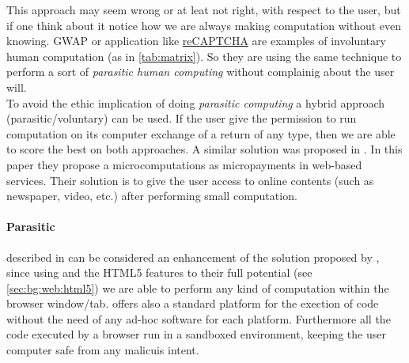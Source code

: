 This approach may seem wrong or at leat not right, with respect to the user, but
if one think about it notice how we are always making computation without even
knowing. \ac{GWAP} or application like \href{http://www.google.com/recaptcha}{reCAPTCHA}
are examples of involuntary human computation (as in \autoref{tab:matrix}). So
they are using the same technique to perform a sort of \emph{parasitic human
computing} without complainig about the user will.\\

To avoid the ethic implication of doing \emph{parasitic computing} a hybrid
approach (parasitic/voluntary) can be used. If the user give the permission to
run computation on its computer exchange of a return of any type, then we are
able to score the best on both approaches. A similar solution was proposed in
\cite{karame2011pay}.
In this paper they propose a microcomputations as micropayments in web-based
services. Their solution is to give the user access to online contents (such as
newspaper, video, etc.) after performing small \js{} computation.

\paragraph{Parasitic \js{}} described in \cite{jenkin2008parasitic} can be
considered an enhancement of the solution proposed by \cite{barabasi2001parasitic},
since using \js{} and the HTML5 features to their full potential (see
\ref{sec:bg:web:html5}) we are able to perform any kind of computation
within the browser window/tab. \js{} offers also a standard platform for the
exection of code without the need of any ad-hoc software for each platform.
Furthermore all the code executed by a browser run in a sandboxed environment,
keeping the user computer safe from any malicuis intent.